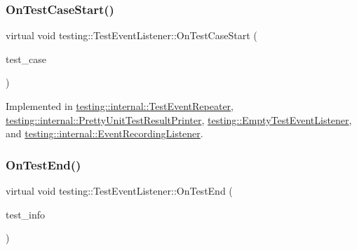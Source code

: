 \mbox{\label{classtesting_1_1TestEventListener_ab4ed885d63f5bbff8076c1329b3dfe36}} 
\subsubsection{\texorpdfstring{OnTestCaseStart()}{OnTestCaseStart()}}
{\footnotesize\ttfamily virtual void testing\+::\+Test\+Event\+Listener\+::\+On\+Test\+Case\+Start (\begin{DoxyParamCaption}\item[{const \mbox{\hyperlink{classtesting_1_1TestCase}{Test\+Case}} \&}]{test\+\_\+case }\end{DoxyParamCaption})\hspace{0.3cm}{\ttfamily [pure virtual]}}



Implemented in \mbox{\hyperlink{classtesting_1_1internal_1_1TestEventRepeater_a70124c738caa338bcd723eb2a51c8b3e}{testing\+::internal\+::\+Test\+Event\+Repeater}}, \mbox{\hyperlink{classtesting_1_1internal_1_1PrettyUnitTestResultPrinter_adcb68c729565d4bcdf8418a52902c3de}{testing\+::internal\+::\+Pretty\+Unit\+Test\+Result\+Printer}}, \mbox{\hyperlink{classtesting_1_1EmptyTestEventListener_ae4707ed9cc7ace5241bc8ccc4051209b}{testing\+::\+Empty\+Test\+Event\+Listener}}, and \mbox{\hyperlink{classtesting_1_1internal_1_1EventRecordingListener_a18c28e1d1c3a1e74e225966456786f8e}{testing\+::internal\+::\+Event\+Recording\+Listener}}.

\mbox{\label{classtesting_1_1TestEventListener_abb1c44525ef038500608b5dc2f17099b}} 
\subsubsection{\texorpdfstring{OnTestEnd()}{OnTestEnd()}}
{\footnotesize\ttfamily virtual void testing\+::\+Test\+Event\+Listener\+::\+On\+Test\+End (\begin{DoxyParamCaption}\item[{const \mbox{\hyperlink{classtesting_1_1TestInfo}{Test\+Info}} \&}]{test\+\_\+info }\end{DoxyParamCaption})\hspace{0.3cm}{\ttfamily [pure virtual]}}



